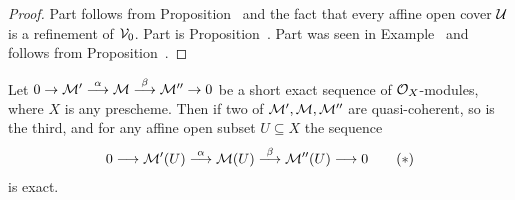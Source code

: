 \documentclass[a4paper,parskip=half,numbers=enddot, DIV=12]{scrreprt}
\begin{document}
\begin{proof}
	Part  follows from Proposition~ and the fact that every affine open cover $\mathcal{U}$ is a refinement of $\mathcal{V}_0$. Part  is Proposition~. Part  was seen in Example~ and  follows from Proposition~.
\end{proof}
\begin{cor}
	Let $0\morphism \Mm'\morphism[\alpha]\Mm\morphism[\beta]\Mm''\morphism0$ be a short exact sequence of $\mathcal{O}_X$-modules, where $X$ is any prescheme. Then if two of $\mathcal{M}',\mathcal{M},\mathcal{M}''$ are quasi-coherent, so is the third, and for any affine open subset $U\subseteq X$ the sequence
	\begin{align}\lbl{eq:exactAffineSectionSequence}
		0\morphism \Mm'(U)\morphism[\alpha]\Mm(U)\morphism[\beta]\Mm''(U)\morphism 0\tag{$*$}
	\end{align}
	is exact.
\end{cor}
\end{document}
